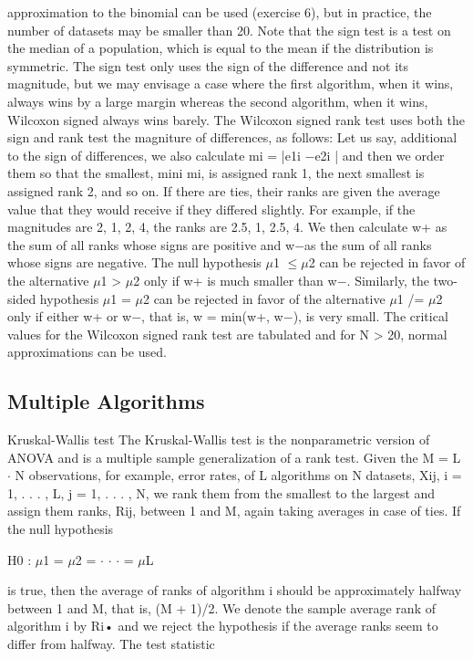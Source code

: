 approximation to the binomial can be used (exercise 6), but in practice, the number of datasets may be smaller than 20. Note that the sign test is a test on the median of a population, which is equal to the mean if the distribution is symmetric. The sign test only uses the sign of the difference and not its magnitude, but we may envisage a case where the first algorithm, when it wins, always wins by a large margin whereas the second algorithm, when it wins, Wilcoxon signed always wins barely. The Wilcoxon signed rank test uses both the sign and rank test the magniture of differences, as follows: Let us say, additional to the sign of differences, we also calculate mi = |e1i $-$e2i | and then we order them so that the smallest, mini mi, is assigned rank 1, the next smallest is assigned rank 2, and so on. If there are ties, their ranks are given the average value that they would receive if they differed slightly. For example, if the magnitudes are 2, 1, 2, 4, the ranks are 2.5, 1, 2.5, 4. We then calculate w+ as the sum of all ranks whose signs are positive and w$-$as the sum of all ranks whose signs are negative. The null hypothesis $\mu$1 $\leq$$\mu$2 can be rejected in favor of the alternative $\mu$1 > $\mu$2 only if w+ is much smaller than w$-$. Similarly, the two-sided hypothesis $\mu$1 = $\mu$2 can be rejected in favor of the alternative $\mu$1 /= $\mu$2 only if either w+ or w$-$, that is, w = min(w+, w$-$), is very small. The critical values for the Wilcoxon signed rank test are tabulated and for N > 20, normal approximations can be used.

\subsection{Multiple Algorithms}

Kruskal-Wallis test The Kruskal-Wallis test is the nonparametric version of ANOVA and is a multiple sample generalization of a rank test. Given the M = L $\cdot$ N observations, for example, error rates, of L algorithms on N datasets, Xij, i = 1, . . . , L, j = 1, . . . , N, we rank them from the smallest to the largest and assign them ranks, Rij, between 1 and M, again taking averages in case of ties. If the null hypothesis

H0 : $\mu$1 = $\mu$2 = $\cdot$ $\cdot$ $\cdot$ = $\mu$L

is true, then the average of ranks of algorithm i should be approximately halfway between 1 and M, that is, (M + 1)/2. We denote the sample average rank of algorithm i by Ri• and we reject the hypothesis if the average ranks seem to differ from halfway. The test statistic

